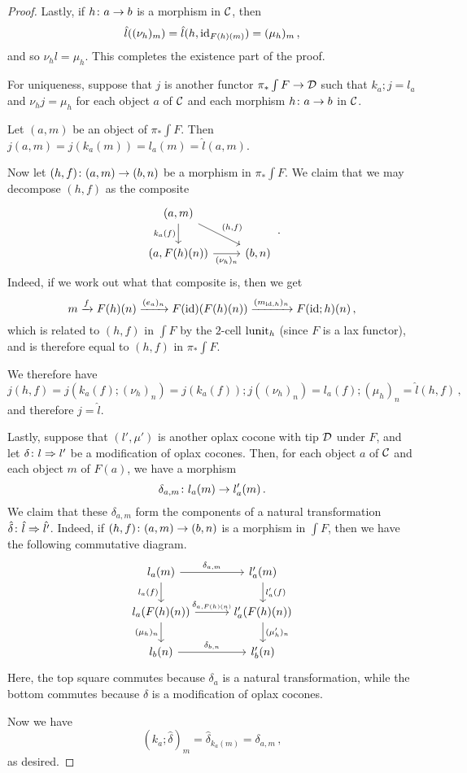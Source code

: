 \begin{proof}
  Lastly, if $h\colon a \to b$ is a morphism in ${\mathcal{C}}$, then 
  \[
    \hat{l}((\nu_h)_m)=\hat{l}(h,\operatorname{id}_{F(h)(m)}) = (\mu_h)_m\,,
    \]
  and so $\nu_hl = \mu_h$.  
  This completes the existence part of the proof.

  For uniqueness, suppose that $j$ is another functor $\pi_*\int F \to {\mathcal{D}}$ such that $k_a;j=l_a$ and $\nu_hj=\mu_h$ for each object $a$ of ${\mathcal{C}}$ and each morphism $h\colon a \to b$ in ${\mathcal{C}}$.

  Let $(a,m)$ be an object of $\pi_*\int F$.  
  Then $j(a,m)=j(k_a(m))=l_a(m)=\hat{l}(a,m)$.  

  Now let $(h,f)\colon (a,m) \to (b,n)$ be a morphism in $\pi_*\int F$.  
  We claim that we may decompose $(h,f)$ as the composite
  \[
    \begin{tikzcd}
      (a,m) \arrow[d, "k_a(f)"'] \arrow[dr, "{(h,f)}"]
        & \\
      (a,F(h)(n)) \arrow[r, "(\nu_h)_n"']
        & (b,n)
    \end{tikzcd}\,.
    \]
  Indeed, if we work out what that composite is, then we get
  \[
    m \xrightarrow{f}
    F(h)(n) \xrightarrow{(e_a)_n}
    F(\operatorname{id})(F(h)(n)) \xrightarrow{(m_{\operatorname{id},h})_n}
    F(\operatorname{id};h)(n)\,,
    \]
  which is related to $(h,f)$ in $\int F$ by the $2$-cell $\operatorname{lunit}_h$ (since $F$ is a lax functor), and is therefore equal to $(h,f)$ in $\pi_*\int F$.

  We therefore have
  \[
    j(h,f) = j(k_a(f);(\nu_h)_n) = j(k_a(f));j((\nu_h)_n) = l_a(f);(\mu_h)_n = \hat{l}(h, f)\,,
    \]
  and therefore $j=\hat{l}$.  

  Lastly, suppose that $(l',\mu')$ is another oplax cocone with tip ${\mathcal{D}}$ under $F$, and let $\delta \colon l \Rightarrow l'$ be a modification of oplax cocones.  
  Then, for each object $a$ of ${\mathcal{C}}$ and each object $m$ of $F(a)$, we have a morphism
  \[
    \delta_{a,m} \colon l_a(m) \to l_a'(m)\,.
    \]
  We claim that these $\delta_{a,m}$ form the components of a natural transformation $\hat{\delta} \colon \hat{l} \Rightarrow \hat{l'}$.  
  Indeed, if $(h, f) \colon (a, m) \to (b, n)$ is a morphism in $\int F$, then we have the following commutative diagram.
  \[
    \begin{tikzcd}[column sep=30pt]
      l_a(m) \arrow[r, "{\delta_{a,m}}"] \arrow[d, "l_a(f)"']
        & l_a'(m) \arrow[d, "l_a'(f)"] \\
      l_a(F(h)(n)) \arrow[r, "{\delta_{a, F(h)(n)}}"] \arrow[d, "(\mu_h)_n"']
        & l_a'(F(h)(n)) \arrow[d, "(\mu_h')_n"] \\
      l_b(n) \arrow[r, "{\delta_{b,n}}"]
        & l_b'(n)
    \end{tikzcd}
    \]
  Here, the top square commutes because $\delta_a$ is a natural transformation, while the bottom commutes because $\delta$ is a modification of oplax cocones.

  Now we have
  \[
    (k_a;\hat{\delta})_m = \hat{\delta}_{k_a(m)} = \delta_{a,m}\,,
    \]
  as desired.
\end{proof}

